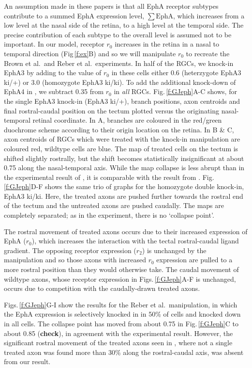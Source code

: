 \documentclass[11pt, a4paper]{article}
\begin{document}
An assumption made in these papers is that all EphA receptor subtypes contribute to a summed EphA expression level, $\sum\mathrm{EphA}$, which increases from a low level at the nasal side of the retina, to a high level at the temporal side.
The precise contribution of each subtype to the overall level is assumed not to be important.
In our model, receptor $r_0$ increases in the retina in a nasal to temporal direction (Fig\,\ref{f:ex}B) and so we will manipulate $r_0$ to recreate the Brown et al.~and Reber et al.~experiments.
In half of the RGCs, we knock-in EphA3 by adding to the value of $r_0$ in these cells either 0.6 (heterzygote EphA3 ki/+) or 3.0 (homozygote EphA3 ki/ki).
To add the additional knock-down of EphA4 in \citet{reber_relative_2004}, we subtract 0.35 from $r_0$ in \emph{all} RGCs.
Fig.\,\ref{f:GJeph}A-C shows, for the single EphA3 knock-in (EphA3 ki/+), branch positions, axon centroids and final rostral-caudal position on the tectum plotted versus the originating nasal-temporal retinal coordinate.
In A, branches are coloured in the red/green duochrome scheme according to their origin location on the retina.
In B \& C, axon centroids of RGCs which were treated with the knock-in manipulation are coloured red, wildtype cells are blue.
The map of treated cells on the tectum is shifted slightly rostrally, but the shift becomes statistically insignificant at about 0.75 along the nasal-temporal axis.
While the map collapse is less abrupt than in the experimental result of \citet{brown_topographic_2000}, it is comparable with the result from \citet{simpson_simple_2011}.
Fig.\,\ref{f:GJeph}D-F shows the same trio of graphs for the homozygote double knock-in, EphA3 ki/ki. Here, the treated axons are pushed further towards the rostral end of the tectum and the untreated axons are pushed caudally.
The maps are completely separated; as in the experiment, there is no `collapse point'.

The rostral movement of treated axons occurs due to their increased expression of EphA ($r_0$), which increases the interaction with the tectal rostral-caudal ligand gradient.
The opposing receptor expression ($r_2$) is unchanged by the manipulation and so those axons with increased $r_0$ expression are pulled to a more rostral position than they would otherwise take.
The caudal movement of wildtype axons, whose receptor expression in Figs.\,\ref{f:GJeph}A-F is unchanged, occurs due to competition with the caudally-drawn treated axons.

Figs.\,\ref{f:GJeph}G-I show the results for the Reber et al.~manipulation, in which the EphA expression is selectively knocked in in 50\% of cells and knocked down in all cells.
The collapse point has moved from about 0.75 in Fig.\,\ref{f:GJeph}C to about 0.85 (\textbf{check}), in agreement with the
experimental result.
However, the significant rostral movement of the treated axons seen in \citet{reber_relative_2004}, where not a single treated axon was found more than 30\% along the rostral-caudal axis, was absent from our result.
\end{document}

